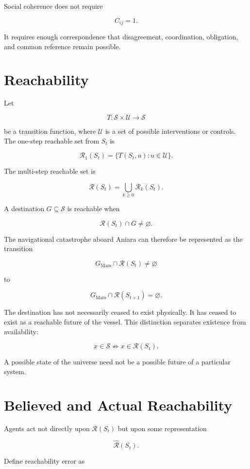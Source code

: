 \documentclass[11pt,oneside]{book}
\theoremstyle{definition}
\theoremstyle{remark}
\begin{document}
Social coherence does not require

\[
C_{ij}=1.
\]

It requires enough correspondence that disagreement, coordination, obligation, and common reference
remain possible.

\section{Reachability}

Let

\[
T:\mathcal{S}\times\mathcal{U}\rightarrow\mathcal{S}
\]

be a transition function, where \(\mathcal{U}\) is a set of possible interventions or controls. The
one-step reachable set from \(S_t\) is

\[
\mathcal{R}_1(S_t) = \{ T(S_t,u):u\in\mathcal{U} \}.
\]

The multi-step reachable set is

\[
\mathcal{R}(S_t) = \bigcup_{k\geq0} \mathcal{R}_k(S_t).
\]

A destination \(G\subseteq\mathcal{S}\) is reachable when

\[
\mathcal{R}(S_t)\cap G\neq\varnothing.
\]

The navigational catastrophe aboard Aniara can therefore be represented as the transition

\[
G_{\mathrm{Mars}} \cap \mathcal{R}(S_t) \neq\varnothing
\]

to

\[
G_{\mathrm{Mars}} \cap \mathcal{R}(S_{t+1}) = \varnothing.
\]

The destination has not necessarily ceased to exist physically. It has ceased to exist as a
reachable future of the vessel. This distinction separates existence from availability:

\[
x\in\mathcal{S} \not\Rightarrow x\in\mathcal{R}(S_t).
\]

A possible state of the universe need not be a possible future of a particular system.

\section{Believed and Actual Reachability}

Agents act not directly upon \(\mathcal{R}(S_t)\) but upon some representation

\[
\widehat{\mathcal{R}}(S_t).
\]

Define reachability error as
\end{document}
